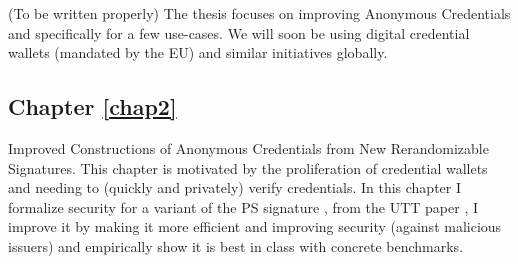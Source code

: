 























































(To be written properly)
The thesis focuses on improving Anonymous Credentials and specifically for a few use-cases. We will soon be using digital credential wallets (mandated by the EU) \cite{european_parliament_meps_2024} and similar initiatives globally. 


\subsection{Chapter \ref{chap2}}
Improved Constructions of Anonymous Credentials from New Rerandomizable Signatures. This chapter is motivated by the proliferation of credential wallets and needing to (quickly and privately) verify credentials. 
In this chapter I formalize security for a variant of the PS signature \cite{sako_short_2016}, from the UTT paper \cite{tomescu_utt_2022}, I improve it by making it more efficient and improving security (against malicious issuers) and empirically show it is best in class with concrete benchmarks. 


